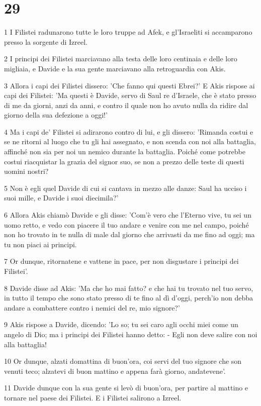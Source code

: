 \chapter{29}

\par 1 I Filistei radunarono tutte le loro truppe ad Afek, e gl'Israeliti si accamparono presso la sorgente di Izreel.
\par 2 I principi dei Filistei marciavano alla testa delle loro centinaia e delle loro migliaia, e Davide e la sua gente marciavano alla retroguardia con Akis.
\par 3 Allora i capi dei Filistei dissero: 'Che fanno qui questi Ebrei?' E Akis rispose ai capi dei Filistei: 'Ma questi è Davide, servo di Saul re d'Israele, che è stato presso di me da giorni, anzi da anni, e contro il quale non ho avuto nulla da ridire dal giorno della sua defezione a oggi!'
\par 4 Ma i capi de' Filistei si adirarono contro di lui, e gli dissero: 'Rimanda costui e se ne ritorni al luogo che tu gli hai assegnato, e non scenda con noi alla battaglia, affinché non sia per noi un nemico durante la battaglia. Poiché come potrebbe costui riacquistar la grazia del signor suo, se non a prezzo delle teste di questi uomini nostri?
\par 5 Non è egli quel Davide di cui si cantava in mezzo alle danze: Saul ha ucciso i suoi mille, e Davide i suoi diecimila?'
\par 6 Allora Akis chiamò Davide e gli disse: 'Com'è vero che l'Eterno vive, tu sei un uomo retto, e vedo con piacere il tuo andare e venire con me nel campo, poiché non ho trovato in te nulla di male dal giorno che arrivasti da me fino ad oggi; ma tu non piaci ai principi.
\par 7 Or dunque, ritornatene e vattene in pace, per non disgustare i principi dei Filistei'.
\par 8 Davide disse ad Akis: 'Ma che ho mai fatto? e che hai tu trovato nel tuo servo, in tutto il tempo che sono stato presso di te fino al dì d'oggi, perch'io non debba andare a combattere contro i nemici del re, mio signore?'
\par 9 Akis rispose a Davide, dicendo: 'Lo so; tu sei caro agli occhi miei come un angelo di Dio; ma i principi dei Filistei hanno detto: - Egli non deve salire con noi alla battaglia!
\par 10 Or dunque, alzati domattina di buon'ora, coi servi del tuo signore che son venuti teco; alzatevi di buon mattino e appena farà giorno, andatevene'.
\par 11 Davide dunque con la sua gente si levò di buon'ora, per partire al mattino e tornare nel paese dei Filistei. E i Filistei salirono a Izreel.

